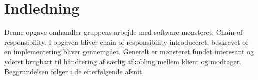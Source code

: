 \chapter{Indledning}\label{ch:introduction}
Denne opgave omhandler gruppens arbejde med software mønsteret: Chain of responsibility. I opgaven bliver chain of responsibility introduceret, beskrevet of en implementering bliver gennemgået. Generelt er mønsteret fundet interesant og yderst brugbart til håndtering af særlig afkobling mellem klient og modtager. Beggrundelsen følger i de efterfølgende afsnit.  